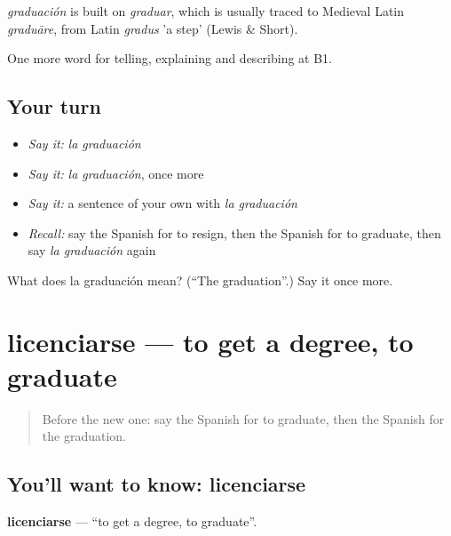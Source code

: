 \begin{cousinweb}
\emph{graduación} is built on \emph{graduar}, which is usually traced to Medieval Latin \emph{graduāre}, from Latin \emph{gradus} 'a step' (Lewis \& Short).
\end{cousinweb}

\begin{grammarlens}[title={What you've built}]
One more word for telling, explaining and describing at B1.
\end{grammarlens}

\subsection*{Your turn}
\begin{itemize}
\raggedright
  \item \emph{Say it:} \emph{la graduación}
  \item \emph{Say it:} \emph{la graduación}, once more
  \item \emph{Say it:} a sentence of your own with \emph{la graduación}
  \item \emph{Recall:} say the Spanish for to resign, then the Spanish for to graduate, then say \emph{la graduación} again
\end{itemize}

\begin{tcolorbox}[breakable,colback=teal!4,colframe=teal!35!black,title={Before you move on}]
What does la graduación mean? (\textquotedblleft{}The graduation\textquotedblright{}.) Say it once more.
\end{tcolorbox}
\section[licenciarse]{licenciarse — to get a degree, to graduate}

\label{lesson:ES-C554-licenciarse}



\begin{quote}
Before the new one: say the Spanish for to graduate, then the Spanish for the graduation.
\end{quote}

\subsection*{You'll want to know: licenciarse}
\textbf{licenciarse} — \textquotedblleft{}to get a degree, to graduate\textquotedblright{}.

